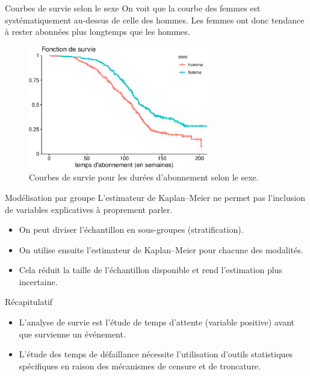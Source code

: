 \documentclass[
  ignorenonframetext,
]{beamer}
\providecommand{\tightlist}{%
  \setlength{\itemsep}{0pt}\setlength{\parskip}{0pt}}\usepackage{longtable,booktabs,array}
\begin{document}
\begin{frame}{Courbes de survie selon le sexe}
\protect\hypertarget{courbes-de-survie-selon-le-sexe}{}
On voit que la courbe des femmes est systématiquement au-dessus de celle
des hommes. Les femmes ont donc tendance à rester abonnées plus
longtemps que les hommes.

\begin{figure}

{\centering \includegraphics[width=0.7\textwidth,height=\textheight]{MATH60602-diapos9_files/figure-beamer/fig-survie-comparaison-courbes-1.pdf}

}

\caption{\label{fig-survie-comparaison-courbes}Courbes de survie pour
les durées d'abonnement selon le sexe.}

\end{figure}
\end{frame}

\begin{frame}{Modélisation par groupe}
\protect\hypertarget{moduxe9lisation-par-groupe}{}
L'estimateur de Kaplan--Meier ne permet pas l'inclusion de variables
explicatives à proprement parler.

\begin{itemize}
\tightlist
\item
  On peut diviser l'échantillon en sous-groupes (stratification).
\item
  On utilise ensuite l'estimateur de Kaplan--Meier pour chacune des
  modalités.
\item
  Cela réduit la taille de l'échantillon disponible et rend l'estimation
  plus incertaine.
\end{itemize}
\end{frame}

\begin{frame}{Récapitulatif}
\protect\hypertarget{ruxe9capitulatif}{}
\begin{itemize}
\tightlist
\item
  L'analyse de survie est l'étude de temps d'attente (variable positive)
  avant que survienne un événement.
\item
  L'étude des temps de défaillance nécessite l'utilisation d'outils
  statistiques spécifiques en raison des mécanismes de censure et de
  troncature.
\end{itemize}
\end{frame}
\end{document}

